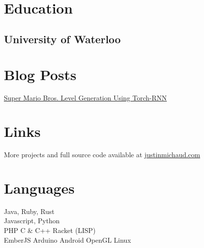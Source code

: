 \documentclass[]{deedy-resume-openfont}
\begin{document}
%
%

%
%

\begin{minipage}[t]{0.31\textwidth} 


\section{Education} 

\subsection{University of Waterloo}
\sectionsep

\section{Blog Posts}
\textbullet{} \href{https://medium.com/@justin_michaud/super-mario-bros-level-generation-using-torch-rnn-726ddea7e9b7}{Super Mario Bros. Level Generation Using Torch-RNN}\\

\section{Links}
More projects and full source code available at \href{http://justinmichaud.com}{justinmichaud.com}

\section{Languages}
Java, Ruby, Rust\\
Javascript, Python\\
PHP \textbullet{} C \& C++ \textbullet{} Racket (LISP) \\
EmberJS \textbullet{} Arduino \textbullet{} Android \textbullet{} OpenGL \textbullet{} Linux\\


\end{minipage}
\end{document}
